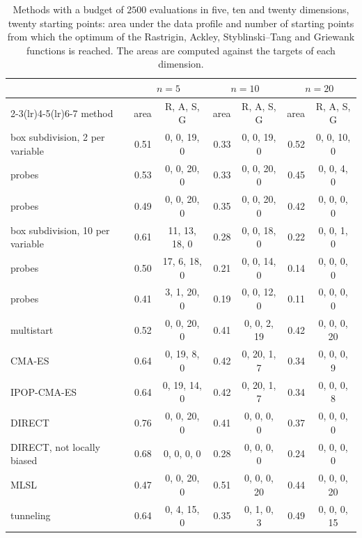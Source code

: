\documentclass[pdflatex,sn-basic]{sn-jnl}
\begin{document}
\begin{table}[t]
  \centering
  \caption{Methods with a budget of $2500$ evaluations in five, ten and twenty
    dimensions, twenty starting points: area under the data profile and number
    of starting points from which the optimum of the Rastrigin, Ackley,
    Styblinski--Tang and Griewank functions is reached. The areas are computed
    against the targets of each dimension.}
  \label{tab:dimensions}
  \scriptsize
  \setlength{\tabcolsep}{2.5pt}
  \begin{tabular}{lrcrcrc}
    \toprule
    & \multicolumn{2}{c}{$n = 5$} & \multicolumn{2}{c}{$n = 10$} & \multicolumn{2}{c}{$n = 20$} \\
    \cmidrule(lr){2-3}\cmidrule(lr){4-5}\cmidrule(lr){6-7}
    method & area & R, A, S, G & area & R, A, S, G & area & R, A, S, G \\
    \midrule
    box subdivision, 2 per variable   & 0.51 & 0, 0, 19, 0 & 0.33 & 0, 0, 19, 0 & 0.52 & 0, 0, 10, 0 \\
    \quad 8 probes                    & 0.53 & 0, 0, 20, 0 & 0.33 & 0, 0, 20, 0 & 0.45 & 0, 0, 4, 0 \\
    \quad 16 probes                   & 0.49 & 0, 0, 20, 0 & 0.35 & 0, 0, 20, 0 & 0.42 & 0, 0, 0, 0 \\
    box subdivision, 10 per variable  & 0.61 & 11, 13, 18, 0 & 0.28 & 0, 0, 18, 0 & 0.22 & 0, 0, 1, 0 \\
    \quad 8 probes                    & 0.50 & 17, 6, 18, 0 & 0.21 & 0, 0, 14, 0 & 0.14 & 0, 0, 0, 0 \\
    \quad 16 probes                   & 0.41 & 3, 1, 20, 0 & 0.19 & 0, 0, 12, 0 & 0.11 & 0, 0, 0, 0 \\
    multistart                        & 0.52 & 0, 0, 20, 0 & 0.41 & 0, 0, 2, 19 & 0.42 & 0, 0, 0, 20 \\
    CMA-ES                            & 0.64 & 0, 19, 8, 0 & 0.42 & 0, 20, 1, 7 & 0.34 & 0, 0, 0, 9 \\
    IPOP-CMA-ES                       & 0.64 & 0, 19, 14, 0 & 0.42 & 0, 20, 1, 7 & 0.34 & 0, 0, 0, 8 \\
    DIRECT                            & 0.76 & 0, 0, 20, 0 & 0.41 & 0, 0, 0, 0 & 0.37 & 0, 0, 0, 0 \\
    DIRECT, not locally biased        & 0.68 & 0, 0, 0, 0 & 0.28 & 0, 0, 0, 0 & 0.24 & 0, 0, 0, 0 \\
    MLSL                              & 0.47 & 0, 0, 20, 0 & 0.51 & 0, 0, 0, 20 & 0.44 & 0, 0, 0, 20 \\
    tunneling                         & 0.64 & 0, 4, 15, 0 & 0.35 & 0, 1, 0, 3 & 0.49 & 0, 0, 0, 15 \\
    \bottomrule
  \end{tabular}
\end{table}
\end{document}
